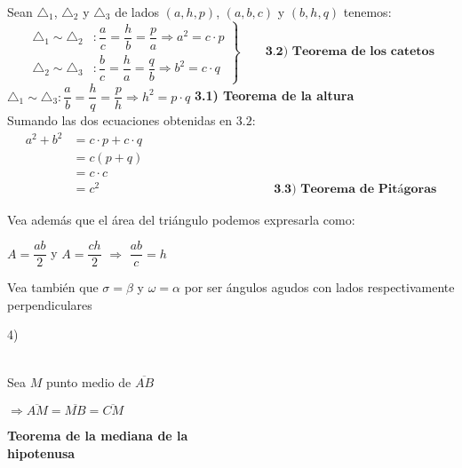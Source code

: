 Sean $\triangle_1$, $\triangle_2$ y $\triangle_3$ de lados $(a,h,p)$, $(a,b,c)$ y $(b,h,q)$ tenemos:
\begin{equation*}
 \left.\begin{aligned}
        \triangle_1 \sim \triangle_2 &: \dfrac{a}{c}=\dfrac{h}{b}=\dfrac{p}{a} \Longrightarrow a^2 = c \cdot p\\
    \triangle_2 \sim \triangle_3 &: \dfrac{b}{c}=\dfrac{h}{a}=\dfrac{q}{b} \Longrightarrow b^2 = c \cdot q
       \end{aligned}
 \right\}
 \qquad \textbf{3.2) Teorema de los catetos}
\end{equation*}
\hspace{1.3cm}$\triangle_1 \sim \triangle_3: \dfrac{a}{b}=\dfrac{h}{q}=\dfrac{p}{h} \Longrightarrow h^2 = p \cdot q$\hspace{0.1cm} \qquad \textbf{3.1) Teorema de la altura}\\

Sumando las dos ecuaciones obtenidas en $3.2$:
\begin{align*}
    a^2 + b^2 &= c \cdot p + c \cdot q\\
              &= c (p + q)\\
              &= c \cdot c\\
              &= c^2 \qquad\qquad\qquad\qquad\qquad\qquad\qquad\textbf{3.3) Teorema de Pitágoras}
\end{align*}

Vea además que el área del triángulo podemos expresarla como:
\begin{center}
$A = \dfrac{ab}{2}$ y $A = \dfrac{ch}{2}$ $\Longrightarrow$ $\dfrac{ab}{c} = h$    
\end{center}

Vea también que $\sigma = \beta$ y $\omega = \alpha$ por ser ángulos agudos con lados respectivamente perpendiculares

\begin{multicols}{2}
4)\vspace*{-0.5cm}\\
\hspace*{0.9cm}
\columnbreak\\

Sea $M$ punto medio de $\overline{AB}$

$\Longrightarrow \overline{AM} = \overline{MB} = \overline{CM}$
\begin{center}
\textbf{Teorema de la mediana de la\\ hipotenusa}
\end{center}
\end{multicols} 

